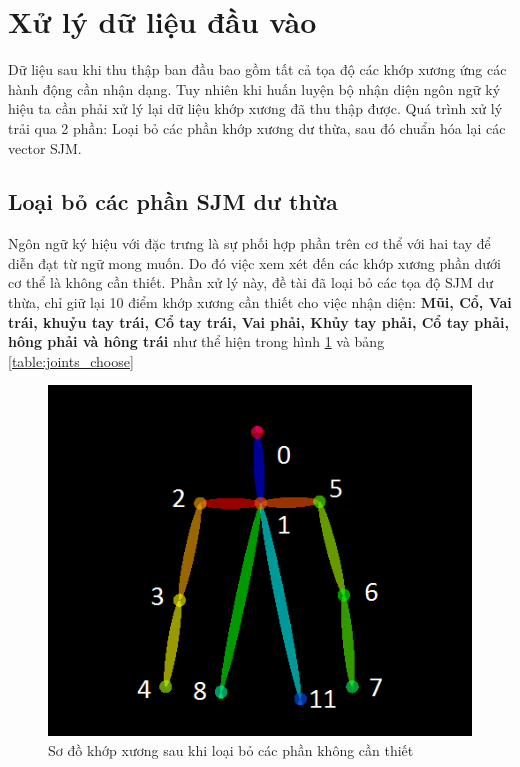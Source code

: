 \section{Xử lý dữ liệu đầu vào}
Dữ liệu sau khi thu thập ban đầu bao gồm tất cả tọa độ các khớp xương ứng các hành động cần nhận dạng. Tuy nhiên khi huấn luyện bộ nhận diện ngôn ngữ ký hiệu ta cần phải xử lý lại dữ liệu khớp xương đã thu thập được. Quá trình xử lý trải qua 2 phần: Loại bỏ các phần khớp xương dư thừa, sau đó chuẩn hóa lại các vector SJM.

\subsection{Loại bỏ các phần SJM dư thừa}
Ngôn ngữ ký hiệu với đặc trưng là sự phối hợp phần trên cơ thể với hai tay để diễn đạt từ ngữ mong muốn. Do đó việc xem xét đến các khớp xương phần dưới cơ thể là không cần thiết. Phần xử lý này, đề tài đã loại bỏ các tọa độ SJM dư thừa, chỉ giữ lại 10 điểm khớp xương cần thiết cho việc nhận diện: \textbf{Mũi, Cổ, Vai trái, khuỷu tay trái, Cổ tay trái, Vai phải, Khủy tay phải, Cổ tay phải, hông phải và hông trái} như thể hiện trong hình \ref{fig:joints} và bảng \ref{table:joints_choose}

\FloatBarrier
\begin{figure}[htp]
\begin{center}
\includegraphics[scale=1]{chap4/c4_figs/joints_choose.png}
\end{center}
\caption{Sơ đồ khớp xương sau khi loại bỏ các phần không cần thiết}
\label{fig:joints}
\end{figure}
\FloatBarrier

